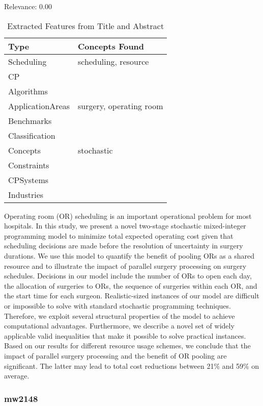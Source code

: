 Relevance:  0.00

{\scriptsize
\begin{longtable}{p{2cm}p{20cm}}
\caption{Extracted Features from Title and Abstract}\\ \toprule
Type & Concepts Found\\ \midrule
\endhead
\bottomrule
\endfoot
Scheduling & scheduling, resource\\ 
CP & \\ 
Algorithms & \\ 
ApplicationAreas & surgery, operating room\\ 
Benchmarks & \\ 
Classification & \\ 
Concepts & stochastic\\ 
Constraints & \\ 
CPSystems & \\ 
Industries & \\ 
\end{longtable}
}

  Operating room (OR) scheduling is an important operational problem for most hospitals. In this study, we present a novel two-stage stochastic mixed-integer programming model to minimize total expected operating cost given that scheduling decisions are made before the resolution of uncertainty in surgery durations. We use this model to quantify the benefit of pooling ORs as a shared resource and to illustrate the impact of parallel surgery processing on surgery schedules. Decisions in our model include the number of ORs to open each day, the allocation of surgeries to ORs, the sequence of surgeries within each OR, and the start time for each surgeon. Realistic-sized instances of our model are difficult or impossible to solve with standard stochastic programming techniques. Therefore, we exploit several structural properties of the model to achieve computational advantages. Furthermore, we describe a novel set of widely applicable valid inequalities that make it possible to solve practical instances. Based on our results for different resource usage schemes, we conclude that the impact of parallel surgery processing and the benefit of OR pooling are significant. The latter may lead to total cost reductions between 21\% and 59\% on average.  

\subsubsection{mw2148}
\label{mw:mw2148}

